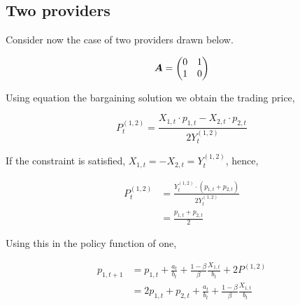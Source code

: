 \subsection{Two providers}

Consider now the case of two providers drawn below.

\vspace{5mm}
\begin{minipage}{.5\textwidth}
    \resizebox{\textwidth}{!}{}
\end{minipage}
\begin{minipage}{.45\textwidth}
    \begin{equation*}
        \bm{A} = \begin{pmatrix}
            0 & 1 \\
            1 & 0
        \end{pmatrix}
    \end{equation*}
\end{minipage}
\vspace{5mm}

Using equation the bargaining solution we obtain the trading price,

\begin{equation}
    P^{(1, 2)}_t = \frac{X_{1, t} \cdot p_{1, t} - X_{2, t} \cdot p_{2, t}}{2 Y^{(1, 2)}_t}
\end{equation}

If the constraint is satisfied, $X_{1, t} = - X_{2, t} = Y^{(1, 2)}_t$, hence,

\begin{equation}
    \begin{split}
        P^{(1, 2)}_t &= \frac{Y^{(1, 2)}_t \cdot \left( p_{1, t} + p_{2, t} \right)}{2  Y^{(1, 2)}_t} \\
        &= \frac{p_{1, t} + p_{2, t}}{2}
    \end{split}
\end{equation}

Using this in the policy function of one,

\begin{equation*}
    \begin{split}
        p_{1, t+1} &= p_{1, t} + \frac{a_t}{b_t} + \frac{1 - \beta}{\beta} \frac{X_{1, t}}{b_t} + 2P^{(1, 2)} \\
        &= 2p_{1, t} + p_{2, t} + \frac{a_t}{b_t} + \frac{1 - \beta}{\beta} \frac{X_{1, t}}{b_t}
    \end{split}
\end{equation*}